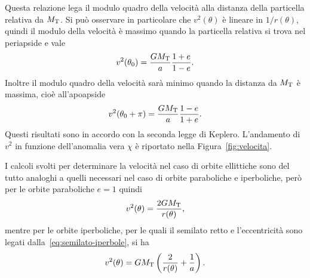 {
Questa relazione lega il modulo quadro della velocità alla distanza della
particella relativa da $M_\textup{T}$. Si può osservare in particolare che
$v^2(\theta)$ è lineare in $1/r(\theta)$, quindi il modulo della velocità è
massimo quando la particella relativa si trova nel periapside e vale
\begin{equation}
  v^2(\theta_0) = \frac{GM_\textup{T}}{a}\frac{1+e}{1-e}.
\end{equation}
Inoltre il modulo quadro della velocità sarà minimo quando la distanza da
$M_\textup{T}$ è massima, cioè all'apoapside
\begin{equation}
  v^2(\theta_0+\pi) = \frac{GM_\textup{T}}{a}\frac{1-e}{1+e}.
\end{equation}
Questi risultati sono in accordo con la seconda legge di Keplero. L'andamento di
$v^2$ in funzione dell'anomalia vera $\chi$ è riportato nella
Figura~\ref{fig:velocita}.

I calcoli svolti per determinare la velocità nel caso di orbite ellittiche sono
del tutto analoghi a quelli necessari nel caso di orbite paraboliche e
iperboliche, però per le orbite paraboliche $e=1$ quindi
\begin{equation}
  \label{eq:velocita-parabola}
  v^2(\theta) = \frac{2GM_\textup{T}}{r(\theta)},
\end{equation}
mentre per le orbite iperboliche, per le quali il semilato retto e
l'eccentricità sono legati dalla~\eqref{eq:semilato-iperbole}, si ha
\begin{equation}
  \label{eq:velocita-iperbole}
  v^2(\theta) = GM_\textup{T}
    \left(
      \frac{2}{r(\theta)} + \frac{1}{a}
    \right).
\end{equation}

}
